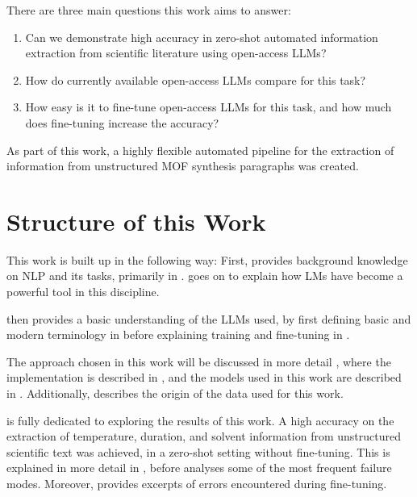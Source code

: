 There are three main questions this work aims to answer:
\begin{enumerate}
    \item Can we demonstrate high accuracy in zero-shot automated information extraction from scientific literature using open-access \glspl{LLM}?
    \item How do currently available open-access \glspl{LLM} compare for this task?
    \item How easy is it to fine-tune open-access \glspl{LLM} for this task, and how much does fine-tuning increase the accuracy?
\end{enumerate}

As part of this work, a highly flexible automated pipeline for the extraction of information from unstructured \gls{MOF} synthesis paragraphs was created.


\section{Structure of this Work}\label{sec:structure}

This work is built up in the following way:
First,  provides background knowledge on \gls{NLP} and its tasks, primarily in .  goes on to explain how \glspl{LM} have become a powerful tool in this discipline.

 then provides a basic understanding of the \glspl{LLM} used, by first defining basic and modern terminology in  before explaining training and fine-tuning in .

The approach chosen in this work will be discussed in more detail , where the implementation is described in , and the models used in this work are described in . Additionally,  describes the origin of the data used for this work.

 is fully dedicated to exploring the results of this work.
A high accuracy on the extraction of temperature, duration, and solvent information from unstructured scientific text was achieved, in a zero-shot setting without fine-tuning.
This is explained in more detail in , before  analyses some of the most frequent failure modes.
Moreover,  provides excerpts of errors encountered during fine-tuning.

